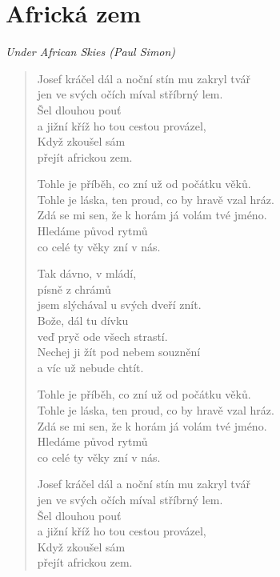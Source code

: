 \section*{Africká zem}

\textit{Under African Skies (Paul Simon)}

\begin{verse}
Josef kráčel dál a noční stín mu zakryl tvář \\
jen ve svých očích míval stříbrný lem. \\
Šel dlouhou pouť \\
a jižní kříž ho tou cestou provázel, \\
Když zkoušel sám \\
přejít africkou zem.

Tohle je příběh, co zní už od počátku věků. \\
Tohle je láska, ten proud, co by hravě vzal hráz. \\
Zdá se mi sen, že k horám já volám tvé jméno. \\
Hledáme původ rytmů \\
co celé ty věky zní v nás.

Tak dávno, v mládí, \\
písně z chrámů \\
jsem slýchával u svých dveří znít. \\
Bože, dál tu dívku \\
veď pryč ode všech strastí. \\
Nechej ji žít pod nebem souznění \\
a víc už nebude chtít.

Tohle je příběh, co zní už od počátku věků. \\
Tohle je láska, ten proud, co by hravě vzal hráz. \\
Zdá se mi sen, že k horám já volám tvé jméno. \\
Hledáme původ rytmů \\
co celé ty věky zní v nás.

Josef kráčel dál a noční stín mu zakryl tvář \\
jen ve svých očích míval stříbrný lem. \\
Šel dlouhou pouť \\
a jižní kříž ho tou cestou provázel, \\
Když zkoušel sám \\
přejít africkou zem.
\end{verse}
